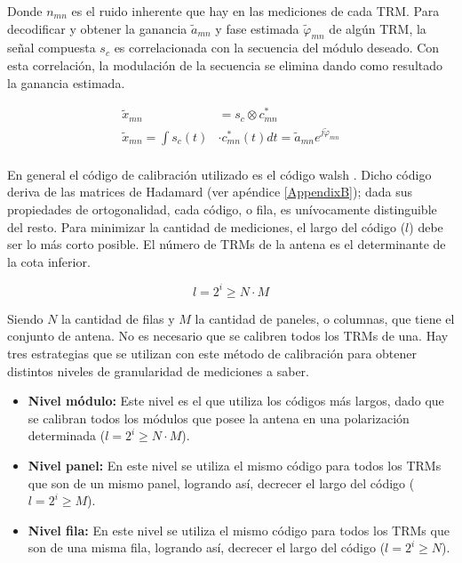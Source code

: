 Donde $n_{mn}$ es el ruido inherente que hay en las mediciones de cada TRM. Para decodificar y obtener la ganancia
$\tilde{a}_{mn}$ y fase estimada $\tilde\varphi_{mn}$ de algún TRM, la señal compuesta $s_c$ es correlacionada con
la secuencia del módulo deseado. Con esta correlación, la modulación de la secuencia se elimina dando como resultado
la ganancia estimada.

\begin{equation}
\begin{aligned}
	\tilde{x}_{mn} &= s_c \otimes c^*_{mn} \\
	\tilde{x}_{mn} = \int s_c(t) &\cdot c^*_{mn}(t) dt = \tilde{a}_{mn}e^{j\tilde{\varphi}_{mn}} \\
\end{aligned}
\label{eq:classic_correlation}
\end{equation}

En general el código de calibración utilizado es el código walsh \cite{WalshCode}. Dicho código deriva de las matrices de 
Hadamard (ver apéndice \ref{AppendixB}); dada sus propiedades de ortogonalidad, cada código, o fila, es unívocamente 
distinguible del resto. Para minimizar la cantidad de mediciones, el largo del código ($l$) debe ser lo más corto posible. 
El número de TRMs de la antena es el determinante de la cota inferior.

\begin{equation}
	l = 2^i \ge N \cdot M
\end{equation}

Siendo $N$ la cantidad de filas y $M$ la cantidad de paneles, o columnas, que tiene el conjunto de antena. No es necesario que
se calibren todos los TRMs de una. Hay tres estrategias que se utilizan con este método de calibración para obtener
distintos niveles de granularidad de mediciones a saber.

\begin{itemize}
	\item \textbf{Nivel módulo:} Este nivel es el que utiliza los códigos más largos, dado que se calibran todos los módulos que
		posee la antena en una polarización determinada ($l = 2^i \ge N \cdot M$).
	\item \textbf{Nivel panel:} En este nivel se utiliza el mismo código para todos los TRMs que son de un mismo panel,
		logrando así, decrecer el largo del código ($l = 2^i \ge M$).
	\item \textbf{Nivel fila:} En este nivel se utiliza el mismo código para todos los TRMs que son de una misma fila,
		logrando así, decrecer el largo del código ($l = 2^i \ge N$).
\end{itemize}

